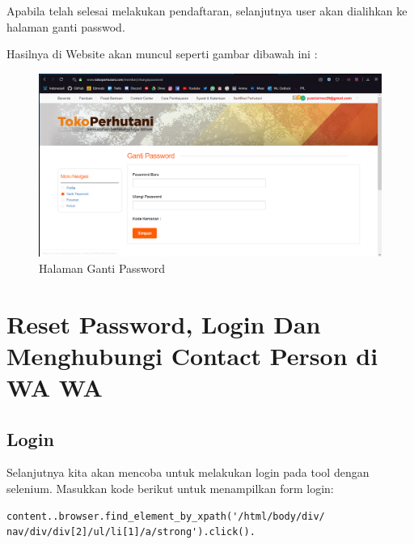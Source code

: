 Apabila telah selesai melakukan pendaftaran, selanjutnya user akan dialihkan ke halaman ganti passwod.

Hasilnya di Website akan muncul seperti gambar dibawah ini :
\begin{figure}[h]
	\centering
	\includegraphics[scale=0.25]{figures/T2Login}
	\caption{Halaman Ganti Password}
\end{figure}

\newpage
\section{Reset Password, Login Dan Menghubungi Contact Person di WA WA}
\subsection{Login}
Selanjutnya kita akan mencoba untuk melakukan login pada tool dengan selenium. 
Masukkan kode berikut untuk menampilkan form login:
\begin{verbatim}
content..browser.find_element_by_xpath('/html/body/div/
nav/div/div[2]/ul/li[1]/a/strong').click().
\end{verbatim}



